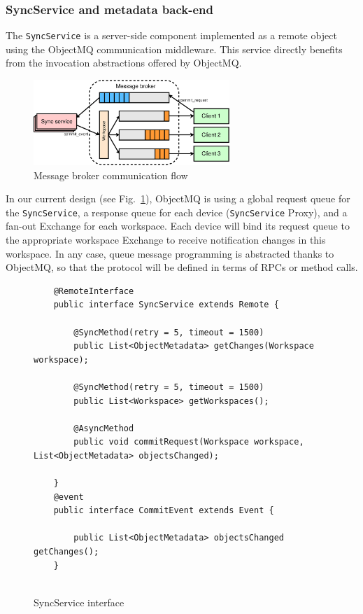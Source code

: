 \subsubsection{SyncService and metadata back-end}

The \texttt{SyncService} is a server-side component implemented as a remote object using the ObjectMQ communication middleware. This service directly benefits from the invocation abstractions offered by ObjectMQ. 


\begin{figure}[t]
\centering
\includegraphics[width=0.66\textwidth]{figures/message_broker}
\caption{Message broker communication flow}\label{fig:message_broker}
\end{figure}


In our current design (see Fig.~\ref{fig:message_broker}), ObjectMQ is using a global request queue for the \texttt{SyncService}, 
a response queue for each device (\texttt{SyncService} Proxy), and a fan-out  Exchange for each workspace.  Each device will bind its request queue to the appropriate workspace Exchange to receive notification changes in this workspace.  In any case, queue message programming is abstracted thanks to ObjectMQ, so that the protocol will be defined in terms of RPCs or method calls.
\vspace{-10pt}

\begin{figure}[h!]
\begin{lstlisting}
	@RemoteInterface
	public interface SyncService extends Remote {

    	@SyncMethod(retry = 5, timeout = 1500)
    	public List<ObjectMetadata> getChanges(Workspace workspace);

    	@SyncMethod(retry = 5, timeout = 1500)
    	public List<Workspace> getWorkspaces();

    	@AsyncMethod
    	public void commitRequest(Workspace workspace, List<ObjectMetadata> objectsChanged);

	}
	@event
	public interface CommitEvent extends Event {
		
		public List<ObjectMetadata> objectsChanged getChanges();
	}
	
		\end{lstlisting}
		\caption{SyncService interface}
		\label{fig:idl}
\label{Code:push}
\vspace{-10pt}
\end{figure}

